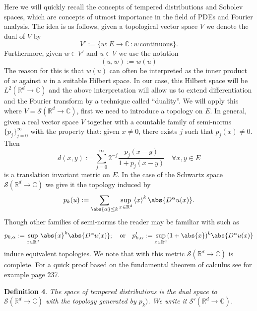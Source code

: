 \documentclass[
]{article}
\begin{document}
Here we will quickly recall the concepts of tempered distributions and
Sobolev spaces, which are concepts of utmost importance in the field of
PDEs and Fourier analysis. The idea is as follows, given a topological
vector space \(V\) we denote the dual of \(V\) by
\[V':=\lbrace w:E\to\mathbb{C}\hspace{2pt}: w \hspace{2pt}\text{continuous}\rbrace.\]
Furthermore, given \(w\in V'\) and \(u\in V\) we use the notation
\[(u,w):=w(u)\] The reason for this is that \(w(u)\) can often be
interpreted as the inner product of \(w\) against \(u\) in a suitable
Hilbert space. In our case, this Hilbert space will be
\(L^2({\mathbb R}^d\to\mathbb{C})\) and the above interpretation will
allow us to extend differentiation and the Fourier transform by a
technique called ``duality''. We will apply this where
\(V={\mathcal S}({\mathbb R}^d\to\mathbb{C})\), first we need to
introduce a topology on \(E\). In general, given a real vector space
\(V\) together with a countable family of semi-norms
\(\lbrace p_j\rbrace_{j=0}^\infty\) with the property that: given
\(x\neq 0\), there exists \(j\) such that \(p_j(x)\neq 0\). Then
\[\label{seminormsgivemetric}
    d(x,y):=\sum_{j=0}^\infty 2^{-j}\frac{p_j(x-y)}{1+p_j(x-y)}\quad \forall{x,y}\in {E}\]
is a translation invariant metric on \(E\). In the case of the Schwartz
space \({\mathcal S}({\mathbb R}^d\to\mathbb{C})\) we give it the
topology induced by \[\label{seminornormsSchwartz}
    p_k(u):=\sum_{\abs{\alpha}\leq k} \sup_{x\in{\mathbb R}^d}\left\langle x\right\rangle^k \abs{D^\alpha u(x)}.\]
Though other families of semi-norms the reader may be familiar with such
as
\[p_{k,\alpha}:=\sup_{x\in{\mathbb R}^d}\abs{x}^k \abs{D^\alpha u(x)};\quad\text{or}\quad p'_{k,\alpha}:=\sup_{x\in{\mathbb R}^d}(1+\abs{x})^k \abs{D^\alpha u(x)}\]
induce equivalent topologies. We note that with this metric
\({\mathcal S}({\mathbb R}^d\to\mathbb{C})\) is complete. For a quick
proof based on the fundamental theorem of calculus see for example
\cite{Foll} page 237.

\textbf{Definition 4}. \emph{The space of \emph{tempered distributions}
is the dual space to \({\mathcal S}({\mathbb R}^d\to\mathbb{C})\) with
the topology generated by \(p_k)\). We write it
\({\mathcal S}'({\mathbb R}^d\to\mathbb{C})\).}
\end{document}
